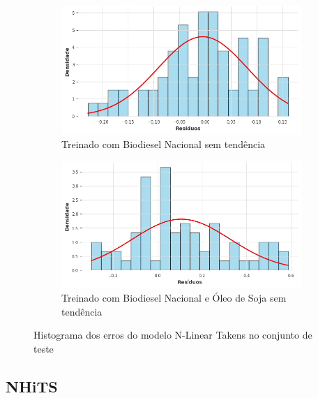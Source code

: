 \begin{figure}[htbp]
	\begin{subfigure}[b]{0.40\textwidth}
		\centering
		\includegraphics[width=\textwidth]{figuras/nlinear_takens_brasil_detrend_residuals_histogram.png} %
		\caption{Treinado com Biodiesel Nacional sem tendência}
		\label{fig:nlinear_takens_brasil_detrend_residuals_histogram}
	\end{subfigure}
	\hfill
	\begin{subfigure}[b]{0.40\textwidth}
		\centering
		\includegraphics[width=\textwidth]{figuras/nlinear_takens_brasil_oil_detrend_residuals_histogram.png} %
		\caption{Treinado com Biodiesel Nacional e Óleo de Soja sem tendência}
		\label{fig:nlinear_takens_brasil_oil_detrend_residuals_histogram}
	\end{subfigure}

	\caption{Histograma dos erros do modelo \acs{N-Linear} Takens no conjunto de teste}
	\label{fig:nlinear_takens_residuals_histogram}
\end{figure}

\subsection{\acs{NHiTS}}
